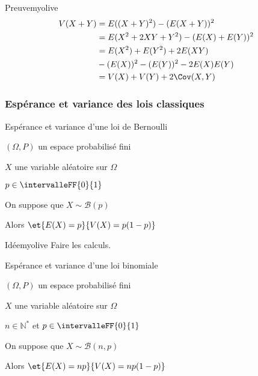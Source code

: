     \begin{demo}{Preuve}{myolive}
        \begin{align*}
            V(X+Y) &= E((X+Y)^2) - (E(X+Y))^2 \\
            &= E(X^2 + 2XY + Y^2) - (E(X) + E(Y))^2 \\
            &= E(X^2) + E(Y^2)  + 2E(XY) \\ 
            &- (E(X))^2 - (E(Y))^2 - 2E(X)E(Y) \\
            &= V(X) + V(Y) + 2\Cov(X,Y)
        \end{align*}
    \end{demo}

    \subsubsection{Espérance et variance des lois classiques}

    \begin{prop}{Espérance et variance d’une loi de Bernoulli}{}
        \begin{soient}
            \item $(\Omega,P)$ un espace probabilisé fini
            \item $X$ une variable aléatoire sur $\Omega$
            \item $p \in \intervalleFF{0}{1}$
        \end{soient}
        On suppose que $X \sim \mathcal{B}(p)$

        Alors $\et{E(X) = p}{V(X) = p(1-p)}$
    \end{prop}

    \begin{demo}{Idée}{myolive}
        Faire les calculs.
    \end{demo}

    \begin{prop}{Espérance et variance d’une loi binomiale}{}
        \begin{soient}
            \item $(\Omega,P)$ un espace probabilisé fini
            \item $X$ une variable aléatoire sur $\Omega$
            \item $n \in \mathbb{N}^*$ et $p \in \intervalleFF{0}{1}$
        \end{soient}
        On suppose que $X \sim \mathcal{B}(n,p)$

        Alors $\et{E(X) = np}{V(X) = np(1-p)}$
    \end{prop}

